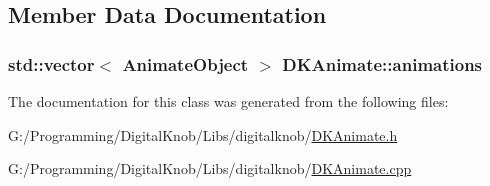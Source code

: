 \subsection{Member Data Documentation}
\hypertarget{class_d_k_animate_a24cf1a5c5d0cfe2b4596c492b50165ec}{
\subsubsection[{animations}]{\setlength{\rightskip}{0pt plus 5cm}std\-::vector$<$ {\bf Animate\-Object} $>$ D\-K\-Animate\-::animations\hspace{0.3cm}{\ttfamily [static]}}}\label{class_d_k_animate_a24cf1a5c5d0cfe2b4596c492b50165ec}


The documentation for this class was generated from the following files\-:\begin{DoxyCompactItemize}
\item 
G\-:/\-Programming/\-Digital\-Knob/\-Libs/digitalknob/\hyperlink{_d_k_animate_8h}{D\-K\-Animate.\-h}\item 
G\-:/\-Programming/\-Digital\-Knob/\-Libs/digitalknob/\hyperlink{_d_k_animate_8cpp}{D\-K\-Animate.\-cpp}\end{DoxyCompactItemize}
